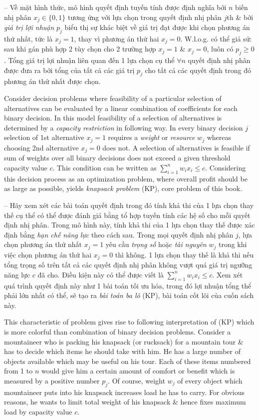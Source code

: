 \documentclass{article}
\begin{document}
\begin{itemize}
\begin{itemize}
        -- Về mặt hình thức, mô hình quyết định tuyến tính được định nghĩa bởi $n$ biến nhị phân $x_j\in\{0,1\}$ tương ứng với lựa chọn trong quyết định nhị phân $j$th \& bởi {\it giá trị lợi nhuận} $p_j$ biểu thị sự khác biệt về giá trị đạt được khi chọn phương án thứ nhất, tức là $x_j = 1$, thay vì phương án thứ hai $x_j = 0$. W.l.o.g. có thể giả sử: sau khi gán phù hợp 2 tùy chọn cho 2 trường hợp $x_j = 1$ \& $x_j = 0$, luôn có $p_j\ge0$. Tổng giá trị lợi nhuận liên quan đến 1 lựa chọn cụ thể $\forall n$ quyết định nhị phân được đưa ra bởi tổng của tất cả các giá trị $p_j$ cho tất cả các quyết định trong đó phương án thứ nhất được chọn.

        Consider decision problems where feasibility of a particular selection of alternatives can be evaluated by a linear combination of coefficients for each binary decision. In this model feasibility of a selection of alternatives is determined by a {\it capacity restriction} in following way. In every binary decision $j$ selection of 1st alternative $x_j = 1$ requires a {\it weight} or {\it resource} $w_j$ whereas choosing 2nd alternative $x_j = 0$ does not. A selection of alternatives is feasible if sum of weights over all binary decisions does not exceed a given threshold capacity value $c$. This condition can be written as $\sum_{i=1}^n w_ix_i\le c$. Considering this decision process as an optimization problem, where overall profit should be as large as possible, yields {\it knapsack problem} (KP), core problem of this book.

        -- Hãy xem xét các bài toán quyết định trong đó tính khả thi của 1 lựa chọn thay thế cụ thể có thể được đánh giá bằng tổ hợp tuyến tính các hệ số cho mỗi quyết định nhị phân. Trong mô hình này, tính khả thi của 1 lựa chọn thay thế được xác định bằng {\it hạn chế năng lực} theo cách sau. Trong mọi quyết định nhị phân $j$, lựa chọn phương án thứ nhất $x_j = 1$ yêu cầu {\it trọng số} hoặc {\it tài nguyên} $w_j$ trong khi việc chọn phương án thứ hai $x_j = 0$ thì không. 1 lựa chọn thay thế là khả thi nếu tổng trọng số trên tất cả các quyết định nhị phân không vượt quá giá trị ngưỡng năng lực $c$ đã cho. Điều kiện này có thể được viết là $\sum_{i=1}^n w_ix_i\le c$. Xem xét quá trình quyết định này như 1 bài toán tối ưu hóa, trong đó lợi nhuận tổng thể phải lớn nhất có thể, sẽ tạo ra {\it bài toán ba lô} (KP), bài toán cốt lõi của cuốn sách này.

        This characteristic of problem gives rise to following interpretation of (KP) which is more colorful than combination of binary decision problems. Consider a mountaineer who is packing his knapsack (or rucksack) for a mountain tour \& has to decide which items he should take with him. He has a large number of objects available which may be useful on his tour. Each of these items numbered from 1 to $n$ would give him a certain amount of comfort or benefit which is measured by a positive number $p_j$. Of course, weight $w_j$ of every object which mountaineer puts into his knapsack increases load he has to carry. For obvious reasons, he wants to limit total weight of his knapsack \& hence fixes maximum load by capacity value $c$.


\end{itemize}
\end{itemize}
\end{document}
